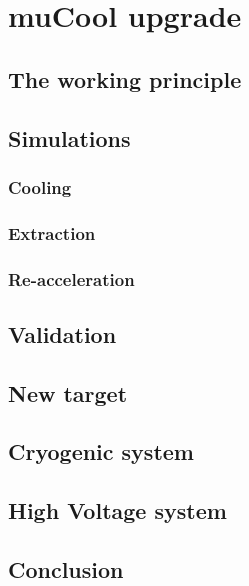 \chapter{muCool upgrade}
\begin{refsection}

\section{The working principle}
\section{Simulations}
\subsection{Cooling}
\subsection{Extraction}
\subsection{Re-acceleration}
\section{Validation}

\section{New target}
\section{Cryogenic system}
\section{High Voltage system}
\section{Conclusion}

\cite{muCool:Taqqu:2006} \cite{muCool:Bao:2014} \cite{muCool:Andreas:2015} \cite{muCool:2018} \cite{muCool:2019} \cite{muCool:Angela:2019} \cite{muCool:2020}


\end{refsection}